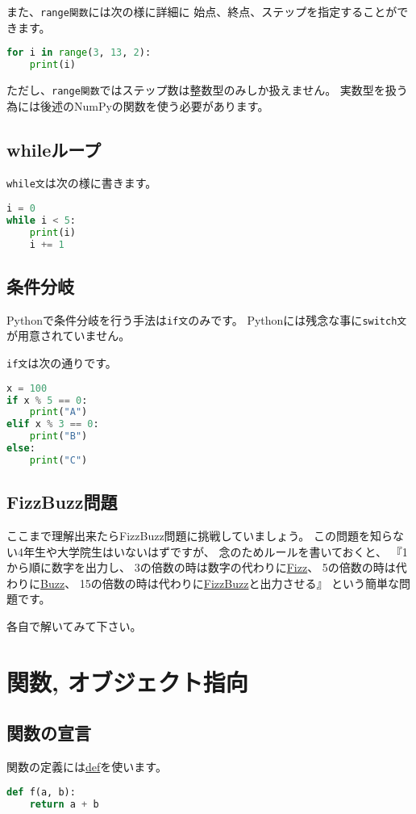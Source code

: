 			また、\texttt{range関数}には次の様に詳細に
			始点、終点、ステップを指定することができます。
	\begin{lstlisting}[language=python, basicstyle=\ttfamily, frame=single, tabsize=4]
for i in range(3, 13, 2):
	print(i)
	\end{lstlisting}
			
			
			ただし、\texttt{range関数}ではステップ数は整数型のみしか扱えません。
			実数型を扱う為には後述のNumPyの関数を使う必要があります。
			
		\subsection{whileループ}
			\texttt{while文}は次の様に書きます。
\begin{lstlisting}[language=python, basicstyle=\ttfamily, frame=single, tabsize=4]
i = 0
while i < 5:
	print(i)
	i += 1
\end{lstlisting}
			
		\subsection{条件分岐}
			Pythonで条件分岐を行う手法は\texttt{if文}のみです。
			Pythonには残念な事に\texttt{switch文}が用意されていません。
			
			\texttt{if文}は次の通りです。
\begin{lstlisting}[language=python, basicstyle=\ttfamily, frame=single, tabsize=4]
x = 100
if x % 5 == 0:
	print("A")
elif x % 3 == 0:
	print("B")
else:
	print("C")
\end{lstlisting}
			
		\subsection{FizzBuzz問題}
			ここまで理解出来たらFizzBuzz問題に挑戦していましょう。
			この問題を知らない4年生や大学院生はいないはずですが、
			念のためルールを書いておくと、
			『1から順に数字を出力し、
			3の倍数の時は数字の代わりに\url{Fizz}、
			5の倍数の時は代わりに\url{Buzz}、
			15の倍数の時は代わりに\url{FizzBuzz}と出力させる』
			という簡単な問題です。
			
			各自で解いてみて下さい。
	
	\newpage
	\section{関数, オブジェクト指向}
		\subsection{関数の宣言}
			関数の定義には\url{def}を使います。
\begin{lstlisting}[language=python, basicstyle=\ttfamily, frame=single, tabsize=4]
def f(a, b):
	return a + b
\end{lstlisting}
			
